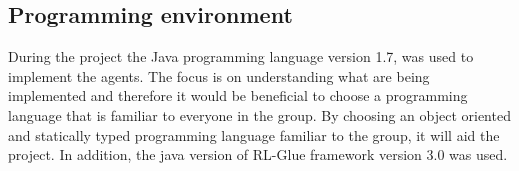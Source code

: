\subsection{Programming environment }
\label{sec:prog_env}
During the project the Java programming language version 1.7, was used to implement the agents. The focus is on understanding what are being implemented and therefore it would be beneficial to choose a programming language that is familiar to everyone in the group. By choosing an object oriented and statically typed programming language familiar to the group, it will aid the project. In addition, the java version of RL-Glue framework version 3.0 was used.
